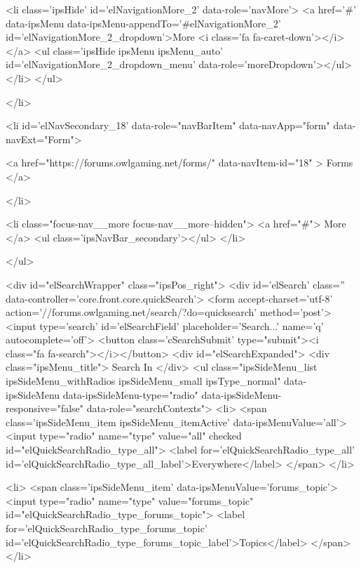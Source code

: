 					<li class='ipsHide' id='elNavigationMore_2' data-role='navMore'>
						<a href='#' data-ipsMenu data-ipsMenu-appendTo='#elNavigationMore_2' id='elNavigationMore_2_dropdown'>More <i class='fa fa-caret-down'></i></a>
						<ul class='ipsHide ipsMenu ipsMenu_auto' id='elNavigationMore_2_dropdown_menu' data-role='moreDropdown'></ul>
					</li>
				</ul>
			
		</li>
	
	

	
		
		
		<li  id='elNavSecondary_18' data-role="navBarItem" data-navApp="form" data-navExt="Form">
			
			
				<a href="https://forums.owlgaming.net/forms/"  data-navItem-id="18"  >
					Forms
				</a>
			
			
		</li>
	
	

				
				<li class="focus-nav__more focus-nav__more--hidden">
					<a href="#"> More </a>
					<ul class='ipsNavBar_secondary'></ul>
				</li>
				
			</ul>
			

	<div id="elSearchWrapper" class="ipsPos_right">
		<div id='elSearch' class='' data-controller='core.front.core.quickSearch'>
			<form accept-charset='utf-8' action='//forums.owlgaming.net/search/?do=quicksearch' method='post'>
				<input type='search' id='elSearchField' placeholder='Search...' name='q' autocomplete='off'>
				<button class='cSearchSubmit' type="submit"><i class="fa fa-search"></i></button>
				<div id="elSearchExpanded">
					<div class="ipsMenu_title">
						Search In
					</div>
					<ul class="ipsSideMenu_list ipsSideMenu_withRadios ipsSideMenu_small ipsType_normal" data-ipsSideMenu data-ipsSideMenu-type="radio" data-ipsSideMenu-responsive="false" data-role="searchContexts">
						<li>
							<span class='ipsSideMenu_item ipsSideMenu_itemActive' data-ipsMenuValue='all'>
								<input type="radio" name="type" value="all" checked id="elQuickSearchRadio_type_all">
								<label for='elQuickSearchRadio_type_all' id='elQuickSearchRadio_type_all_label'>Everywhere</label>
							</span>
						</li>
						
						
							<li>
								<span class='ipsSideMenu_item' data-ipsMenuValue='forums_topic'>
									<input type="radio" name="type" value="forums_topic" id="elQuickSearchRadio_type_forums_topic">
									<label for='elQuickSearchRadio_type_forums_topic' id='elQuickSearchRadio_type_forums_topic_label'>Topics</label>
								</span>
							</li>
						
